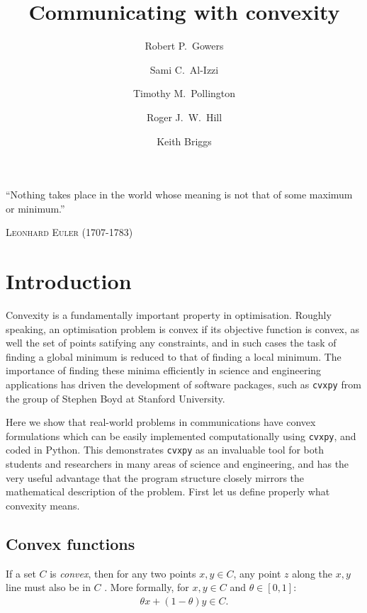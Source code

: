 \documentclass[twocolumn,secnumarabic,amssymb, nobibnotes, aps, prl,superscriptaddress]{revtex4-1}
\newcommand{\NewsItem}[1]{%
		\large #1 \vspace{4pt}
		\par \normalsize \normalfont}
\newcommand{\NewsAuthor}[1]{%
			\hfill \textsc{#1} \vspace{4pt}
			\par \normalfont}
\begin{document}

\title{Communicating with convexity}
\author{Robert P.~Gowers}%
\author{Sami C.~Al-Izzi}%
\author{Timothy M.~Pollington}%
\author{Roger J.~W.~Hill}%
\author{Keith Briggs}
\maketitle


	\NewsItem{\noindent``Nothing takes place in the world whose meaning is not that of some maximum or minimum.''}
	\NewsAuthor{Leonhard Euler (1707-1783)}
    
\section{Introduction}
\noindent Convexity is a fundamentally important property in optimisation. Roughly speaking, an optimisation problem is convex if its objective function is convex, as well the set of points satifying any constraints, and in such cases the task of finding a global minimum is reduced to that of finding a local minimum. The importance of finding these minima efficiently in science and engineering applications has driven the development of software packages, such as \texttt{cvxpy} from the group of Stephen Boyd at Stanford University.

Here we show that real-world problems in communications have convex formulations which can be easily implemented computationally using \texttt{cvxpy}, and coded in Python. This demonstrates \texttt{cvxpy} as an invaluable tool for both students and researchers in many areas of science and engineering, and has the very useful advantage that the program structure closely mirrors the mathematical description of the problem. First let us define properly what convexity means.

\subsection{Convex functions}
\noindent{}If a set $C$ is \textit{convex}, then for any two points $x,y\in C$, any point $z$ along the $x,y$ line must also be in $C$ \cite[p.23]{cvxpybook}. More formally, for $x,y\in C$ and $\theta\in [0,1]$:
\begin{align}
\theta x + (1-\theta)y\in C.
\end{align}
\end{document}
